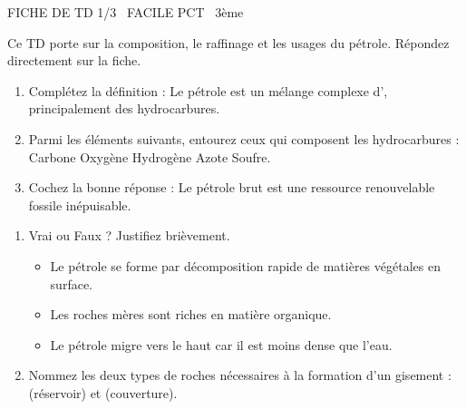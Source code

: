 \documentclass[11pt]{article}
\begin{document}
\begin{tcolorbox}[enhanced,colback=popink,colframe=popink,arc=10pt,boxrule=0pt,left=12pt,right=12pt,top=9pt,bottom=9pt]
{\color{white}\popxbold\small FICHE DE TD 1/3 \textbullet\ FACILE \hfill PCT \textbullet\ 3ème\par}
\end{tcolorbox}
\vspace{4pt}
Ce TD porte sur la composition, le raffinage et les usages du pétrole. Répondez directement sur la fiche.

\begin{exercice}
\begin{enumerate}
    \item Complétez la définition : Le pétrole est un mélange complexe d'\underline{\hspace{4cm}}, principalement des hydrocarbures.
    \item Parmi les éléments suivants, entourez ceux qui composent les hydrocarbures : \quad Carbone \quad Oxygène \quad Hydrogène \quad Azote \quad Soufre.
    \item Cochez la bonne réponse : Le pétrole brut est une ressource \quad renouvelable \quad fossile \quad inépuisable.
\end{enumerate}
\end{exercice}

\begin{exercice}
\begin{enumerate}
    \item Vrai ou Faux ? Justifiez brièvement.
    \begin{itemize}
        \item[--] Le pétrole se forme par décomposition rapide de matières végétales en surface. \quad \underline{\hspace{6cm}}
        \item[--] Les roches mères sont riches en matière organique. \quad \underline{\hspace{6cm}}
        \item[--] Le pétrole migre vers le haut car il est moins dense que l'eau. \quad \underline{\hspace{6cm}}
    \end{itemize}
    \item Nommez les deux types de roches nécessaires à la formation d'un gisement : \underline{\hspace{4cm}} (réservoir) et \underline{\hspace{4cm}} (couverture).
\end{enumerate}
\end{exercice}
\end{document}
